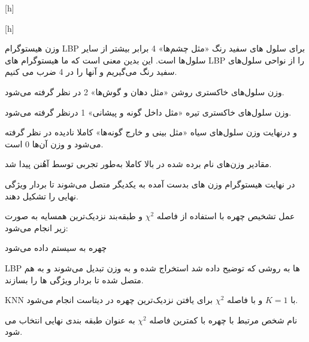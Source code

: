 [h]

[h]

وزن هیستوگرام LBP برای سلول های سفید رنگ «مثل چشم‌ها» 4 برابر بیشتر از سایر سلول‌ها است. این بدین معنی است که ما هیستوگرام های LBP را از نواحی سلول‌های سفید رنگ می‌گیریم و آنها را در 4 ضرب می کنیم.

وزن سلول‌های خاکستری روشن «مثل دهان و گوش‌ها» 2 در نظر گرفته می‌شود.

وزن سلول‌های خاکستری تیره «مثل داخل گونه و پیشانی» 1 درنظر گرفته می‌شود.

و درنهایت وزن سلول‌های سیاه «مثل بینی و خارج گونه‌ها» کاملا نادیده در نظر گرفته می‌شود و وزن آن‌ها 0 است.

مقادیر وزن‌های نام برده شده در بالا کاملا به‌طور تجربی توسط آهُنن پیدا شد.

در نهایت هیستوگرام وزن های بدست آمده به یکدیگر متصل می‌شوند تا بردار ویژگی نهایی را تشکیل دهند.

عمل تشخیص چهره با استفاده از فاصله $\chi^{2}$ و طبقه‌بند نزدیک‌ترین همسایه به صورت زیر انجام می‌شود:


 چهره به سیستم داده می‌شود

 LBP ها به روشی که توضیح داده شد استخراج شده و به وزن تبدیل می‌شوند و به هم متصل شده تا بردار ویژگی ها را بسازند.

 KNN با $ K=1 $ و با فاصله $\chi^{2}$ برای یافتن نزدیک‌ترین چهره در دیتاست انجام می‌شود.

 نام شخص مرتبط با چهره با کمترین فاصله $\chi^{2}$ به عنوان طبقه بندی نهایی انتخاب می شود.

